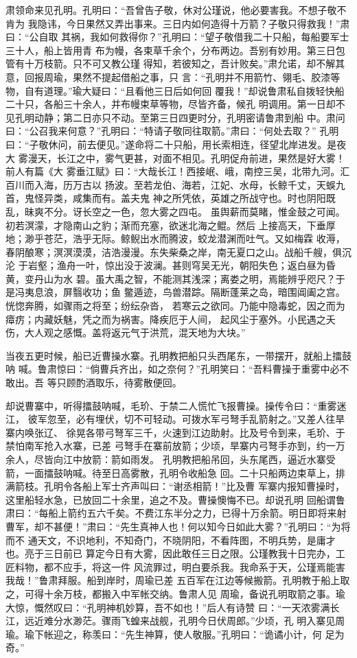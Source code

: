 肃领命来见孔明。孔明曰：“吾曾告子敬，休对公瑾说，他必要害我。不想子敬不肯为
我隐讳，今日果然又弄出事来。三日内如何造得十万箭？子敬只得救我！”肃曰：“公自取
其祸，我如何救得你？”孔明曰：“望子敬借我二十只船，每船要军士三十人，船上皆用青
布为幔，各束草千余个，分布两边。吾别有妙用。第三日包管有十万枝箭。只不可又教公瑾
得知，若彼知之，吾计败矣。”肃允诺，却不解其意，回报周瑜，果然不提起借船之事，只
言：“孔明并不用箭竹、翎毛、胶漆等物，自有道理。”瑜大疑曰：“且看他三日后如何回
覆我！”却说鲁肃私自拨轻快船二十只，各船三十余人，并布幔束草等物，尽皆齐备，候孔
明调用。第一日却不见孔明动静；第二日亦只不动。至第三日四更时分，孔明密请鲁肃到船
中。肃问曰：“公召我来何意？”孔明曰：“特请子敬同往取箭。”肃曰：“何处去取？”
孔明曰：“子敬休问，前去便见。”遂命将二十只船，用长索相连，径望北岸进发。是夜大
雾漫天，长江之中，雾气更甚，对面不相见。孔明促舟前进，果然是好大雾！前人有篇《大
雾垂江赋》曰：“大哉长江！西接岷、峨，南控三吴，北带九河。汇百川而入海，历万古以
扬波。至若龙伯、海若，江妃、水母，长鲸千丈，天蜈九首，鬼怪异类，咸集而有。盖夫鬼
神之所凭依，英雄之所战守也。时也阴阳既乱，昧爽不分。讶长空之一色，忽大雾之四屯。
虽舆薪而莫睹，惟金鼓之可闻。初若溟濛，才隐南山之豹；渐而充塞，欲迷北海之鲲。然后
上接高天，下垂厚地；渺乎苍茫，浩乎无际。鲸鲵出水而腾波，蛟龙潜渊而吐气。又如梅霖
收溽，春阴酿寒；溟溟漠漠，洁浩漫漫。东失柴桑之岸，南无夏口之山。战船千艘，俱沉沦
于岩壑；渔舟一叶，惊出没于波澜。甚则穹吴无光，朝阳失色；返白昼为昏黄，变丹山为水
碧。虽大禹之智，不能测其浅深；离娄之明，焉能辨乎咫尺？于是冯夷息浪，屏翳收功；鱼
鳖遁迹，鸟兽潜踪。隔断蓬莱之岛，暗围阊阖之宫。恍惚奔腾，如骤雨之将至；纷纭杂沓，
若寒云之欲同。乃能中隐毒蛇，因之而为瘴疠；内藏妖魅，凭之而为祸害。降疾厄于人间，
起风尘于塞外。小民遇之夭伤，大人观之感慨。盖将返元气于洪荒，混天地为大块。”

当夜五更时候，船已近曹操水寨。孔明教把船只头西尾东，一带摆开，就船上擂鼓呐
喊。鲁肃惊曰：“倘曹兵齐出，如之奈何？”孔明笑曰：“吾料曹操于重雾中必不敢出。吾
等只顾酌酒取乐，待雾散便回。

却说曹寨中，听得擂鼓呐喊，毛玠、于禁二人慌忙飞报曹操。操传令曰：“重雾迷江，
彼军忽至，必有埋伏，切不可轻动。可拨水军弓弩手乱箭射之。”又差人往旱寨内唤张辽、
徐晃各带弓弩军三千，火速到江边助射。比及号令到来，毛玠、于禁怕南军抢入水寨，已差
弓弩手在寨前放箭；少顷，旱寨内弓弩手亦到，约一万余人，尽皆向江中放箭：箭如雨发。
孔明教把船吊回，头东尾西，逼近水寨受箭，一面擂鼓呐喊。待至日高雾散，孔明令收船急
回。二十只船两边束草上，排满箭枝。孔明令各船上军士齐声叫曰：“谢丞相箭！”比及曹
军寨内报知曹操时，这里船轻水急，已放回二十余里，追之不及。曹操懊悔不已。却说孔明
回船谓鲁肃曰：“每船上箭约五六千矣。不费江东半分之力，已得十万余箭。明日即将来射
曹军，却不甚便！”肃曰：“先生真神人也！何以知今日如此大雾？”孔明曰：“为将而不
通天文，不识地利，不知奇门，不晓阴阳，不看阵图，不明兵势，是庸才也。亮于三日前已
算定今日有大雾，因此敢任三日之限。公瑾教我十日完办，工匠料物，都不应手，将这一件
风流罪过，明白要杀我。我命系于天，公瑾焉能害我哉！”鲁肃拜服。船到岸时，周瑜已差
五百军在江边等候搬箭。孔明教于船上取之，可得十余万枝，都搬入中军帐交纳。鲁肃人见
周瑜，备说孔明取箭之事。瑜大惊，慨然叹曰：“孔明神机妙算，吾不如也！”后人有诗赞
曰：“一天浓雾满长江，远近难分水渺茫。骤雨飞蝗来战舰，孔明今日伏周郎。”少顷，孔
明入寨见周瑜。瑜下帐迎之，称羡曰：“先生神算，使人敬服。”孔明曰：“诡谲小计，何
足为奇。”

